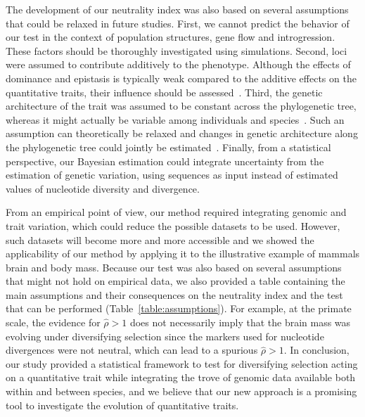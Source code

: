 \documentclass{article}
\newcommand{\EstNI}{\widehat{\rho}}
\begin{document}
The development of our neutrality index was also based on several assumptions that could be relaxed in future studies.
First, we cannot predict the behavior of our test in the context of population structures, gene flow and introgression.
These factors should be thoroughly investigated using simulations.
Second, loci were assumed to contribute additively to the phenotype.
Although the effects of dominance and epistasis is typically weak compared to the additive effects on the quantitative traits, their influence should be assessed~\parencite{hill_data_2008, crow_epistasis_2010}.
Third, the genetic architecture of the trait was assumed to be constant across the phylogenetic tree, whereas it might actually be variable among individuals and species~\parencite{tung_genetic_2015, huber_conservatism_2015}.
Such an assumption can theoretically be relaxed and changes in genetic architecture along the phylogenetic tree could jointly be estimated~\parencite{arnold_understanding_2008, hohenlohe_mipod_2008, kostikova_bridging_2016, gaboriau_multiplatform_2020}.
Finally, from a statistical perspective, our Bayesian estimation could integrate uncertainty from the estimation of genetic variation, using sequences as input instead of estimated values of nucleotide diversity and divergence.

From an empirical point of view, our method required integrating genomic and trait variation, which could reduce the possible datasets to be used.
However, such datasets will become more and more accessible and we showed the applicability of our method by applying it to the illustrative example of mammals brain and body mass.
Because our test was also based on several assumptions that might not hold on empirical data, we also provided a table containing the main assumptions and their consequences on the neutrality index and the test that can be performed (Table~\ref{table:assumptions}).
For example, at the primate scale, the evidence for $\EstNI > 1$ does not necessarily imply that the brain mass was evolving under diversifying selection since the markers used for nucleotide divergences were not neutral, which can lead to a spurious $\EstNI > 1$.
In conclusion, our study provided a statistical framework to test for diversifying selection acting on a quantitative trait while integrating the trove of genomic data available both within and between species, and we believe that our new approach is a promising tool to investigate the evolution of quantitative traits.
\end{document}

